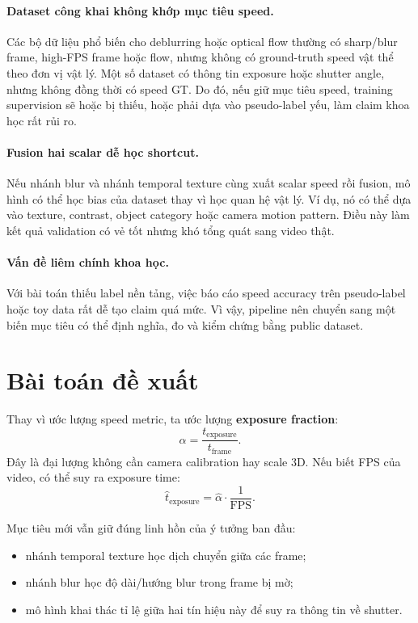 \documentclass[11pt,a4paper]{article}
\newcommand{\alphahat}{\hat{\alpha}}
\begin{document}
\paragraph{Dataset công khai không khớp mục tiêu speed.}
Các bộ dữ liệu phổ biến cho deblurring hoặc optical flow thường có sharp/blur frame, high-FPS frame hoặc flow, nhưng không có ground-truth speed vật thể theo đơn vị vật lý. Một số dataset có thông tin exposure hoặc shutter angle, nhưng không đồng thời có speed GT. Do đó, nếu giữ mục tiêu speed, training supervision sẽ hoặc bị thiếu, hoặc phải dựa vào pseudo-label yếu, làm claim khoa học rất rủi ro.

\paragraph{Fusion hai scalar dễ học shortcut.}
Nếu nhánh blur và nhánh temporal texture cùng xuất scalar speed rồi fusion, mô hình có thể học bias của dataset thay vì học quan hệ vật lý. Ví dụ, nó có thể dựa vào texture, contrast, object category hoặc camera motion pattern. Điều này làm kết quả validation có vẻ tốt nhưng khó tổng quát sang video thật.

\paragraph{Vấn đề liêm chính khoa học.}
Với bài toán thiếu label nền tảng, việc báo cáo speed accuracy trên pseudo-label hoặc toy data rất dễ tạo claim quá mức. Vì vậy, pipeline nên chuyển sang một biến mục tiêu có thể định nghĩa, đo và kiểm chứng bằng public dataset.

\section{Bài toán đề xuất}

Thay vì ước lượng speed metric, ta ước lượng \textbf{exposure fraction}:
\[
    \alpha = \frac{t_{\mathrm{exposure}}}{t_{\mathrm{frame}}}.
\]
Đây là đại lượng không cần camera calibration hay scale 3D. Nếu biết FPS của video, có thể suy ra exposure time:
\[
    \hat{t}_{\mathrm{exposure}} = \alphahat \cdot \frac{1}{\mathrm{FPS}}.
\]

Mục tiêu mới vẫn giữ đúng linh hồn của ý tưởng ban đầu:
\begin{itemize}[leftmargin=1.5em]
    \item nhánh temporal texture học dịch chuyển giữa các frame;
    \item nhánh blur học độ dài/hướng blur trong frame bị mờ;
    \item mô hình khai thác tỉ lệ giữa hai tín hiệu này để suy ra thông tin về shutter.
\end{itemize}
\end{document}
